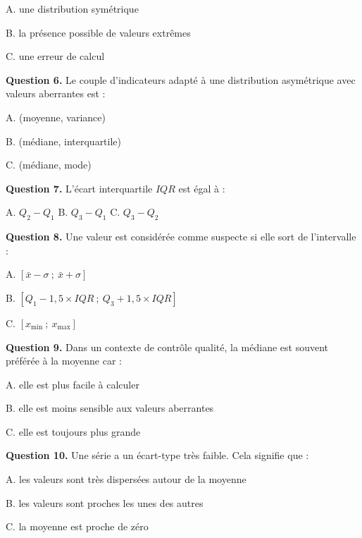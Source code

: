 \documentclass[11pt,a4paper]{article}
\begin{document}
\begin{evaluation}
\hspace{1cm} A. une distribution symétrique

\hspace{1cm} B. la présence possible de valeurs extrêmes

\hspace{1cm} C. une erreur de calcul

\vspace{0.4cm}
\textbf{Question 6.} Le couple d'indicateurs adapté à une distribution asymétrique avec valeurs aberrantes est :

\hspace{1cm} A. (moyenne, variance)

\hspace{1cm} B. (médiane, interquartile)

\hspace{1cm} C. (médiane, mode)

\vspace{0.4cm}
\textbf{Question 7.} L'écart interquartile $IQR$ est égal à :

\hspace{1cm} A. $Q_2 - Q_1$ \hspace{2.5cm} B. $Q_3 - Q_1$ \hspace{2.5cm} C. $Q_3 - Q_2$

\vspace{0.4cm}
\textbf{Question 8.} Une valeur est considérée comme suspecte si elle sort de l'intervalle :

\hspace{1cm} A. $[\bar{x} - \sigma\ ;\ \bar{x} + \sigma]$

\hspace{1cm} B. $[Q_1 - 1{,}5 \times IQR\ ;\ Q_3 + 1{,}5 \times IQR]$

\hspace{1cm} C. $[x_{\min}\ ;\ x_{\max}]$

\vspace{0.4cm}
\textbf{Question 9.} Dans un contexte de contrôle qualité, la médiane est souvent préférée à la moyenne car :

\hspace{1cm} A. elle est plus facile à calculer

\hspace{1cm} B. elle est moins sensible aux valeurs aberrantes

\hspace{1cm} C. elle est toujours plus grande

\vspace{0.4cm}
\textbf{Question 10.} Une série a un écart-type très faible. Cela signifie que :

\hspace{1cm} A. les valeurs sont très dispersées autour de la moyenne

\hspace{1cm} B. les valeurs sont proches les unes des autres

\hspace{1cm} C. la moyenne est proche de zéro

\end{evaluation}
\end{document}
